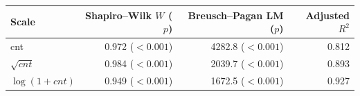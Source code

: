 \begin{tabular}{lrrr}
\toprule
Scale & Shapiro--Wilk $W$ ($p$) & Breusch--Pagan LM ($p$) & Adjusted $R^2$ \\
\midrule
cnt & 0.972 ($<0.001$) & 4282.8 ($<0.001$) & 0.812 \\
$\sqrt{cnt}$ & 0.984 ($<0.001$) & 2039.7 ($<0.001$) & 0.893 \\
$\log(1+cnt)$ & 0.949 ($<0.001$) & 1672.5 ($<0.001$) & 0.927 \\
\bottomrule
\end{tabular}
